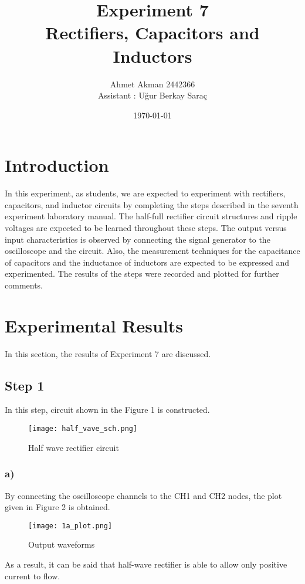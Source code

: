 \documentclass[letterpaper,12pt]{article}
\begin{document}
\title{Experiment 7 \protect\\Rectifiers, Capacitors and Inductors}
\author{Ahmet Akman 2442366 \protect\\ Assistant : Uğur Berkay Saraç}
\date{\today}
\maketitle
\newpage
\tableofcontents
\newpage

\section{Introduction} 
In this experiment, as students, we are expected to experiment with rectifiers, capacitors, and inductor circuits by completing the steps described in the seventh experiment laboratory manual. The half-full rectifier circuit structures and ripple voltages are expected to be learned throughout these steps. The output versus input characteristics is observed by connecting the signal generator to the oscilloscope and the circuit. Also, the measurement techniques for the capacitance of capacitors and the inductance of inductors are expected to be expressed and experimented. The results of the steps were recorded and plotted for further comments.
\section{Experimental Results}
In this section, the results of Experiment 7 are discussed. 
\subsection{Step 1}
In this step, circuit shown in the Figure 1  is constructed. 
\begin{figure}[H]
	\centering
   \texttt{[image: half\_vave\_sch.png]}
   \caption{Half wave rectifier circuit}
\end{figure}
\subsubsection{a)}
By connecting the oscilloscope channels to the CH1 and CH2 nodes, the plot given in Figure 2 is obtained.
\begin{figure}[H]
	\centering
   \texttt{[image: 1a\_plot.png]}
   \caption{Output waveforms}
\end{figure}
As a result, it can be said that half-wave rectifier is able to allow only positive current to flow.
\end{document}
